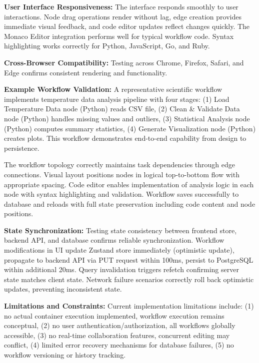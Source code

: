 \documentclass[12pt]{article}
\begin{document}
\hspace{\parindent}\textbf{User Interface Responsiveness:} The interface responds smoothly to user interactions. Node drag operations render without lag, edge creation provides immediate visual feedback, and code editor updates reflect changes quickly. The Monaco Editor integration performs well for typical workflow code. Syntax highlighting works correctly for Python, JavaScript, Go, and Ruby.

\hspace{\parindent}\textbf{Cross-Browser Compatibility:} Testing across Chrome, Firefox, Safari, and Edge confirms consistent rendering and functionality.

\hspace{\parindent}\textbf{Example Workflow Validation:} A representative scientific workflow implements temperature data analysis pipeline with four stages: (1) Load Temperature Data node (Python) reads CSV file, (2) Clean \& Validate Data node (Python) handles missing values and outliers, (3) Statistical Analysis node (Python) computes summary statistics, (4) Generate Visualization node (Python) creates plots. This workflow demonstrates end-to-end capability from design to persistence.

The workflow topology correctly maintains task dependencies through edge connections. Visual layout positions nodes in logical top-to-bottom flow with appropriate spacing. Code editor enables implementation of analysis logic in each node with syntax highlighting and validation. Workflow saves successfully to database and reloads with full state preservation including code content and node positions.

\hspace{\parindent}\textbf{State Synchronization:} Testing state consistency between frontend store, backend API, and database confirms reliable synchronization. Workflow modifications in UI update Zustand store immediately (optimistic update), propagate to backend API via PUT request within 100ms, persist to PostgreSQL within additional 20ms. Query invalidation triggers refetch confirming server state matches client state. Network failure scenarios correctly roll back optimistic updates, preventing inconsistent state.

\hspace{\parindent}\textbf{Limitations and Constraints:} Current implementation limitations include: (1) no actual container execution implemented, workflow execution remains conceptual, (2) no user authentication/authorization, all workflows globally accessible, (3) no real-time collaboration features, concurrent editing may conflict, (4) limited error recovery mechanisms for database failures, (5) no workflow versioning or history tracking.
\end{document}
